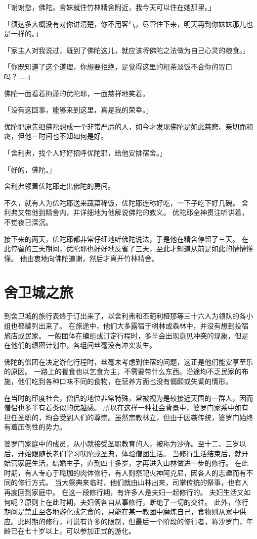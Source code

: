 \documentclass[twoside,openany]{book}
\begin{document}
「谢谢您，佛陀。舍妹就住竹林精舍附近，我今天可以住在她那里。」

「须达多大概没有对你讲清楚，你不用客气，尽管住下来，明天再到你妹妹那儿也是一样的。」

「家主人对我说过，既到了佛陀这儿，就应该将佛陀之法做为自己心灵的粮食。」

「你既知道了这个道理，你想要拒绝，是觉得这里的粗茶淡饭不合你的胃口吗？……」

佛陀一面看着拘谨的优陀耶，一面慈祥地笑着。

「没有这回事，能够来到这里，真是我的荣幸。」

优陀耶原先把佛陀想成一个非常严厉的人，如今才发现佛陀是如此慈悲、亲切而和霭，但他一时间也不知如何是好。

「舍利弗，找个人好好招呼优陀耶，给他安排宿舍。」

「好的，佛陀。」

舍利弗领着优陀耶走出佛陀的房间。

不久，就有人为优陀耶送来蔬菜稀饭，优陀耶连称好吃，一下子吃下好几碗。
舍利弗又带他到精舍内，并详细地为他解说佛陀的教义。
优陀耶全神贯注听讲着，不觉夜已深沉。

接下来的两天，优陀耶都非常仔细地听佛陀说法，于是他在精舍停留了三天。
在此停留的三天期间，优陀耶也好好地反省了三天，至此才知道从前是如此的懵懵懂懂。
他由衷地向佛陀道谢，然后才离开竹林精舍。

\section{舍卫城之旅}\label{sec6.4}

到舍卫城的旅行表终于订出来了，以舍利弗和丕葩利\textperiodcentered 桠那等三十六人为领队的各小组也都编列出来了。
在旅途中，他们大多露宿于树林或森林中，并没有想到投宿旅店或民家。
一般团体在编组或订定行程时，多半会出现意见冲突的现象，但是在他们的缜密计划中，各组间丝毫没有冲突发生。

佛陀的僧团在决定游化行程时，丝毫未考虑到住宿的问题，这正是他们能安享至乐的原因。
一路上的餐食也以乞食为主，不需要带什么东西。沿途均不乏民家的布施，他们吃到各种口味不同的食物，在营养方面也没有偏颇或失调的情形。

在当时的印度社会，僧侣的地位非常特殊，常被视为是较接近天国的一群人，因而僧侣也多半有着类似的优越感。
所以在这样一种社会背景中，婆罗门家系中如有担任圣职的，均会受到人们的尊崇。虽然宗教林立，但由于因袭传统，婆罗门始终有着压倒性的势力。

婆罗门家庭中的成员，从小就接受圣职教育的人，被称为沙弥。至十二、三岁以后，开始跟随长老们学习吠陀或圣典，体验僧团生活。
当修行生活结束后，就开始营家庭生活，结婚生子，直到四十多岁，才再进入山林做进一步的修行。
在此时期，有人专心于瑜珈的肉体修行，有人则祭祀火神阿克尼，因各人的志趣而有不同的修行方式。
当大祭典来临时，他们就由山林出来，司掌传统的祭事，也有人再度回到家庭中。
在这一段修行期，有许多人是夫妇一起修行的。
夫妇生活又如何呢？原则上在此时期，夫妇俩各自从事修行，断绝了一切的交往。
此外，修行期间是禁止至各地游化或乞食的，只能在某一教团中磨炼自己，食物则从家中供应。此时期的修行，可说有许多的限制，但最后一个阶段的修行者，称沙罗门，年龄已在七十岁以上，可以参加正式的游化。
\end{document}
